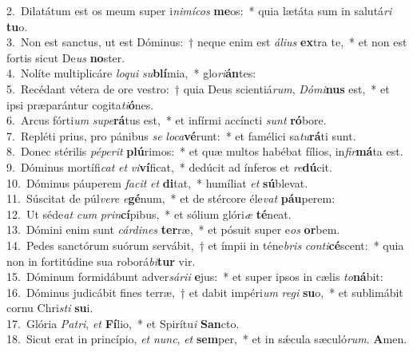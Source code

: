 {2.~}Dilatátum est os meum super i\textit{ni}\textit{mí}\textit{cos} \textbf{me}os:~* quia lætáta sum in salutá\textit{ri} \textbf{tu}o.\\
{3.~}Non est sanctus, ut est Dóminus:~† neque enim est \textit{á}\textit{li}\textit{us} \textbf{ex}tra te,~* et non est fortis sicut De\textit{us} \textbf{no}ster.\\
{4.~}Nolíte multiplicáre \textit{lo}\textit{qui} \textit{su}\textbf{blí}mia,~* glo\textit{ri}\textbf{án}tes:\\
{5.~}Recédant vétera de ore vestro:~† quia Deus scientiá\textit{rum}, \textit{Dó}\textit{mi}\textbf{nus} est,~* et ipsi præparántur cogita\textit{ti}\textbf{ó}nes.\\
{6.~}Arcus fórti\textit{um} \textit{su}\textit{pe}\textbf{rá}tus est,~* et infírmi accíncti \textit{sunt} \textbf{ró}bore.\\
{7.~}Repléti prius, pro pánibus \textit{se} \textit{lo}\textit{ca}\textbf{vé}runt:~* et famélici sa\textit{tu}\textbf{rá}ti sunt.\\
{8.~}Donec stérilis \textit{pé}\textit{pe}\textit{rit} \textbf{plú}rimos:~* et quæ multos habébat fílios, in\textit{fir}\textbf{má}ta est.\\
{9.~}Dóminus mortífi\textit{cat} \textit{et} \textit{vi}\textbf{ví}ficat,~* dedúcit ad ínferos et \textit{re}\textbf{dú}cit.\\
{10.~}Dóminus páuperem \textit{fa}\textit{cit} \textit{et} \textbf{di}tat,~* humíliat \textit{et} \textbf{sú}blevat.\\
{11.~}Súscitat de púl\textit{ve}\textit{re} \textit{e}\textbf{gé}num,~* et de stércore éle\textit{vat} \textbf{páu}perem:\\
{12.~}Ut séde\textit{at} \textit{cum} \textit{prin}\textbf{cí}pibus,~* et sólium glóri\textit{æ} \textbf{té}neat.\\
{13.~}Dómini enim sunt \textit{cár}\textit{di}\textit{nes} \textbf{ter}ræ,~* et pósuit super e\textit{os} \textbf{or}bem.\\
{14.~}Pedes sanctórum suórum servábit,~† et ímpii in téne\textit{bris} \textit{con}\textit{ti}\textbf{cé}scent:~* quia non in fortitúdine sua roborá\textit{bi}\textbf{tur} vir.\\
{15.~}Dóminum formidábunt adver\textit{sá}\textit{ri}\textit{i} \textbf{e}jus:~* et super ipsos in cælis \textit{to}\textbf{ná}bit:\\
{16.~}Dóminus judicábit fines terræ,~† et dabit impéri\textit{um} \textit{re}\textit{gi} \textbf{su}o,~* et sublimábit cornu Chri\textit{sti} \textbf{su}i.\\
{17.~}Glória \textit{Pa}\textit{tri}, \textit{et} \textbf{Fí}lio,~* et Spirítu\textit{i} \textbf{San}cto.\\
{18.~}Sicut erat in princípio, \textit{et} \textit{nunc}, \textit{et} \textbf{sem}per,~* et in sǽcula sæculó\textit{rum}. \textbf{A}men.\\

